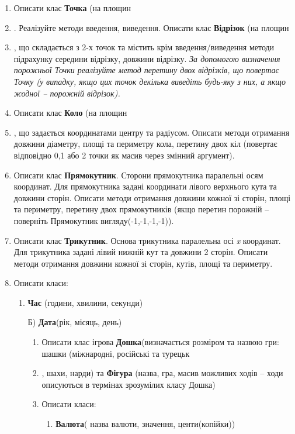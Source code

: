 \documentclass[]{article}
\makeatletter
\newcommand{\xslalph}[1]{\expandafter\@xslalph\csname c@#1\endcsname}
\newcommand{\@xslalph}[1]{%
    \ifcase#1\or а\or б\or в\or г\or д\or e\or є\or ж\or з\or i%
    \or й\or к\or л\or м\or н\or о\or п\or р\or с\or т%
    \or у\or ф\or х\or ц\or ч\or ш\or ю\or я\or аа\or бб\or вв%
    \else\@ctrerr\fi%
}
\makeatother
\begin{document}
\begin{enumerate}
\begin{enumerate}[label=\xslalph*)]
\begin{enumerate}
\begin{enumerate}[label=\xslalph*)]
\begin{enumerate}
\def\labelenumi{\arabic{enumi})}
\item
  Описати клас \textbf{Точка} (на площин\item. Реалізуйте методи введення,
  виведення. Описати клас \textbf{Відрізок} (на площин\item, що складається
  з 2-х точок та містить крім введення/виведення методи підрахунку
  середини відрізку, довжини відрізку. \emph{За допомогою визначення
  порожньої Точки реалізуйте метод перетину двох відрізків, що повертає
  Точку (у випадку, якщо цих точок декілька виведіть будь-яку з них, а
  якщо жодної -- порожній відрізок).}
\item
  Описати клас \textbf{Коло} (на площин\item, що задається координатами
  центру та радіусом. Описати методи отримання довжини діаметру, площі
  та периметру кола, перетину двох кіл (повертає відповідно 0,1 або 2
  точки як масив через змінний аргумент).
\item
  Описати клас \textbf{Прямокутник}. Сторони прямокутника паралельні
  осям координат. Для прямокутника задані координати лівого верхнього
  кута та довжини сторін. Описати методи отримання довжини кожної зі
  сторін, площі та периметру, перетину двох прямокутників (якщо перетин
  порожній -- поверніть Прямокутник вигляду(-1,-1,-1,-1)).
\item
  Описати клас \textbf{Трикутник}. Основа трикутника паралельна осі
  \emph{x} координат. Для трикутника задані лівий нижній кут та довжини
  2 сторін. Описати методи отримання довжини кожної зі сторін, кутів,
  площі та периметру.
\item
  Описати класи:
\begin{enumerate}[label=\xslalph*)]
\item \textbf{Час} (години, хвилини, секунди)

Б) \textbf{Дата}(рік, місяць, день)

\begin{enumerate}
\def\labelenumi{\arabic{enumi})}
\item
  Описати клас ігрова \textbf{Дошка}(визначається розміром та назвою
  гри: шашки (міжнародні, російські та турецьк\item, шахи, нарди) та
  \textbf{Фігура} (назва, гра, масив можливих ходів -- ходи описуються в
  термінах зрозумілих класу Дошка)
\item
  Описати класи:
\begin{enumerate}[label=\xslalph*)]
\item \textbf{Валюта}( назва валюти, значення, центи(копійки))


\end{enumerate}
\end{enumerate}
\end{enumerate}
\end{enumerate}
\end{enumerate}
\end{enumerate}
\end{enumerate}
\end{enumerate}
\end{document}
